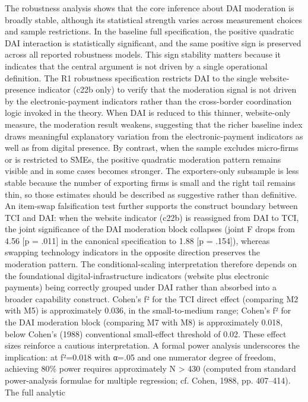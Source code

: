 \documentclass[12pt,a4paper]{article}
\begin{document}
The robustness analysis shows that the core inference about DAI
moderation is broadly stable, although its statistical strength varies
across measurement choices and sample restrictions. In the baseline full
specification, the positive quadratic DAI interaction is statistically
significant, and the same positive sign is preserved across all reported
robustness models. This sign stability matters because it indicates that
the central argument is not driven by a single operational definition.
The R1 robustness specification restricts DAI to the single
website-presence indicator (c22b only) to verify that the moderation
signal is not driven by the electronic-payment indicators rather than
the cross-border coordination logic invoked in the theory. When DAI is
reduced to this thinner, website-only measure, the moderation result
weakens, suggesting that the richer baseline index draws meaningful
explanatory variation from the electronic-payment indicators as well as
from digital presence. By contrast, when the sample excludes micro-firms
or is restricted to SMEs, the positive quadratic moderation pattern
remains visible and in some cases becomes stronger. The exporters-only
subsample is less stable because the number of exporting firms is small
and the right tail remains thin, so those estimates should be described
as suggestive rather than definitive. An item-swap falsification test
further supports the construct boundary between TCI and DAI: when the
website indicator (c22b) is reassigned from DAI to TCI, the joint
significance of the DAI moderation block collapses (joint F drops from
4.56 {[}p = .011{]} in the canonical specification to 1.88 {[}p =
.154{]}), whereas swapping technology indicators in the opposite
direction preserves the moderation pattern. The conditional-scaling
interpretation therefore depends on the foundational
digital-infrastructure indicators (website plus electronic payments)
being correctly grouped under DAI rather than absorbed into a broader
capability construct. Cohen's f² for the TCI direct effect (comparing M2
with M5) is approximately 0.036, in the small-to-medium range; Cohen's
f² for the DAI moderation block (comparing M7 with M8) is approximately
0.018, below Cohen's (1988) conventional small-effect threshold of 0.02.
These effect sizes reinforce a cautious interpretation. A formal power
analysis underscores the implication: at f²=0.018 with α=.05 and one
numerator degree of freedom, achieving 80\% power requires approximately
N \textgreater{} 430 (computed from standard power-analysis formulae for
multiple regression; cf. Cohen, 1988, pp. 407--414). The full analytic
\end{document}
